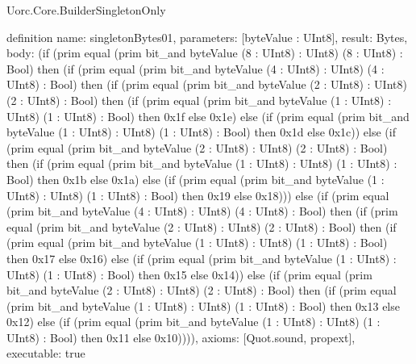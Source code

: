\begin{lexlean}{Uorc.Core.BuilderSingletonOnly}
\begin{semanticmodule}
definition{
  name: singletonBytes01,
  parameters: [byteValue : UInt8],
  result: Bytes,
  body: (if (prim equal (prim bit_and byteValue (8 : UInt8) : UInt8) (8 : UInt8) : Bool) then (if (prim equal (prim bit_and byteValue (4 : UInt8) : UInt8) (4 : UInt8) : Bool) then (if (prim equal (prim bit_and byteValue (2 : UInt8) : UInt8) (2 : UInt8) : Bool) then (if (prim equal (prim bit_and byteValue (1 : UInt8) : UInt8) (1 : UInt8) : Bool) then 0x1f else 0x1e) else (if (prim equal (prim bit_and byteValue (1 : UInt8) : UInt8) (1 : UInt8) : Bool) then 0x1d else 0x1c)) else (if (prim equal (prim bit_and byteValue (2 : UInt8) : UInt8) (2 : UInt8) : Bool) then (if (prim equal (prim bit_and byteValue (1 : UInt8) : UInt8) (1 : UInt8) : Bool) then 0x1b else 0x1a) else (if (prim equal (prim bit_and byteValue (1 : UInt8) : UInt8) (1 : UInt8) : Bool) then 0x19 else 0x18))) else (if (prim equal (prim bit_and byteValue (4 : UInt8) : UInt8) (4 : UInt8) : Bool) then (if (prim equal (prim bit_and byteValue (2 : UInt8) : UInt8) (2 : UInt8) : Bool) then (if (prim equal (prim bit_and byteValue (1 : UInt8) : UInt8) (1 : UInt8) : Bool) then 0x17 else 0x16) else (if (prim equal (prim bit_and byteValue (1 : UInt8) : UInt8) (1 : UInt8) : Bool) then 0x15 else 0x14)) else (if (prim equal (prim bit_and byteValue (2 : UInt8) : UInt8) (2 : UInt8) : Bool) then (if (prim equal (prim bit_and byteValue (1 : UInt8) : UInt8) (1 : UInt8) : Bool) then 0x13 else 0x12) else (if (prim equal (prim bit_and byteValue (1 : UInt8) : UInt8) (1 : UInt8) : Bool) then 0x11 else 0x10)))),
  axioms: [Quot.sound, propext],
  executable: true
}


\end{semanticmodule}
\end{lexlean}

